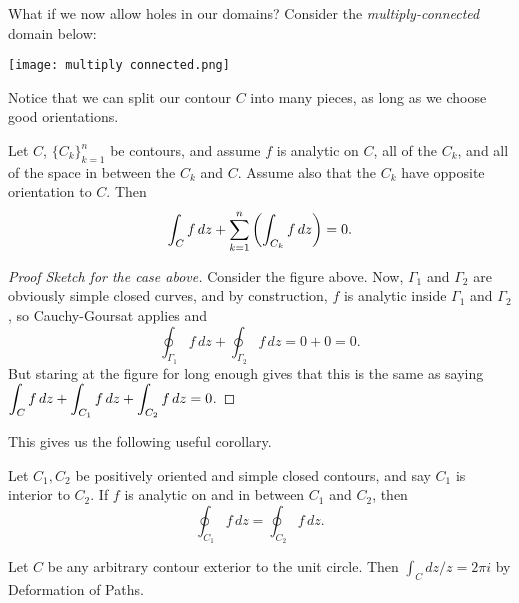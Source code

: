 \documentclass{article}
\begin{document}
What if we now allow holes in our domains? Consider the \textit{multiply-connected} domain below:
\begin{center}
\texttt{[image: multiply connected.png]}
\end{center}
Notice that we can split our contour $C$ into many pieces, as long as we choose good orientations.
\begin{theorem}
Let $C$, $\{C_k\}_{k=1}^n$ be contours, and assume $f$ is analytic on $C$, all of the $C_k$, and all of the space in between the $C_k$ and $C$. Assume also that the $C_k$ have opposite orientation to $C$. Then
$$\int_C f\, dz + \sum_{k=1}^n \left(\int_{C_k} f\, dz \right) = 0.$$
\end{theorem}
\begin{proof}[Proof Sketch for the case above]
Consider the figure above. Now, $\Gamma_1$ and $\Gamma_2$ are obviously simple closed curves, and by construction, $f$ is analytic inside $\Gamma_1$ and $\Gamma_2$, so Cauchy-Goursat applies and
$$\oint_{\Gamma_1} f\, dz + \oint_{\Gamma_2} f\, dz =0+0=0.$$
But staring at the figure for long enough gives that this is the same as saying $\displaystyle\int_C f\, dz + \int_{C_1} f\, dz + \int_{C_2} f\, dz = 0$.
\end{proof}
This gives us the following useful corollary.
\begin{corollary}
Let $C_1, C_2$ be positively oriented and simple closed contours, and say $C_1$ is interior to $C_2$. If $f$ is analytic on and in between $C_1$ and $C_2$, then
$$\oint_{C_1} f\, dz = \oint_{C_2} f\, dz.$$
\end{corollary}
\begin{example}
Let $C$ be any arbitrary contour exterior to the unit circle. Then $\int_C dz/z = 2\pi i$ by Deformation of Paths.
\end{example}
\end{document}

